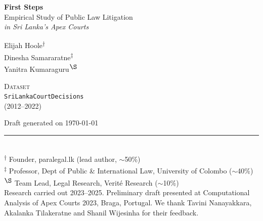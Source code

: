 \begin{titlepage}
\thispagestyle{empty}
\vspace*{0.5cm}
\begin{center}
{\Large\bfseries First Steps\\[0.15cm]}
{\normalsize Empirical Study of Public Law Litigation\\[0.2cm]}
{\small\itshape in Sri Lanka's Apex Courts\\[0.8cm]}

{\small Elijah Hoole\textsuperscript{$\dagger$}\\[0.1cm]
Dinesha Samararatne\textsuperscript{$\ddagger$}\\[0.1cm]
Yanitra Kumaraguru\textsuperscript{$\S$}\\[0.6cm]}

{\scriptsize\scshape Dataset}\\[0.15cm]
{\small\texttt{SriLankaCourtDecisions}\\(2012--2022)\\[0.6cm]}

{\scriptsize Draft generated on \today}
\end{center}
\vfill

\noindent\rule{\textwidth}{0.4pt}\\[0.2cm]
{\tiny
\textsuperscript{$\dagger$} Founder, paralegal.lk (lead author, $\sim$50\%)\\[0.1cm]
\textsuperscript{$\ddagger$} Professor, Dept of Public \& International Law, University of Colombo ($\sim$40\%)\\[0.1cm]
\textsuperscript{$\S$} Team Lead, Legal Research, Verité Research ($\sim$10\%)\\[0.2cm]
Research carried out 2023--2025. Preliminary draft presented at Computational Analysis of Apex Courts 2023, Braga, Portugal. We thank Tavini Nanayakkara, Akalanka Tilakeratne and Shanil Wijesinha for their feedback.
}
\end{titlepage}
\setcounter{page}{1}
